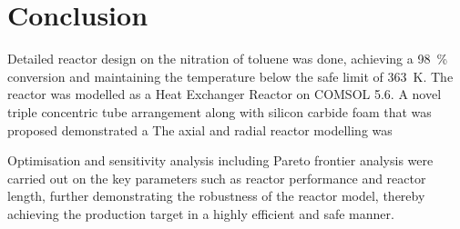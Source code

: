 \section{Conclusion} \label{sec:conclusion}
Detailed reactor design on the nitration of toluene was done, achieving a \SI{98}{\%} conversion and maintaining the temperature below the safe limit of \SI{363}{\K}. The reactor was modelled as a Heat Exchanger Reactor on COMSOL 5.6. A novel triple concentric tube arrangement along with silicon carbide foam that was proposed demonstrated a 
The axial and radial reactor modelling was 

Optimisation and sensitivity analysis including Pareto frontier analysis were carried out on the key parameters such as reactor performance and reactor length, further demonstrating the robustness of the reactor model, thereby achieving the production target in a highly efficient and safe manner.  

